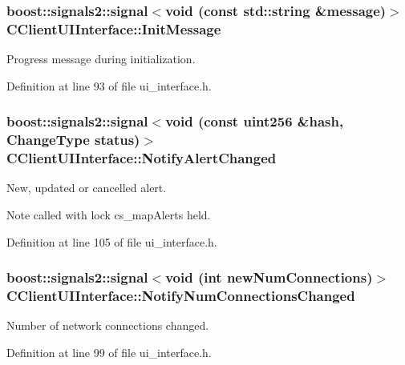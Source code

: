 \subsubsection[{Init\+Message}]{\setlength{\rightskip}{0pt plus 5cm}boost\+::signals2\+::signal$<$void (const std\+::string \&message)$>$ C\+Client\+U\+I\+Interface\+::\+Init\+Message}\label{class_c_client_u_i_interface_abc63cc3f3e5e15632f713d859dbc6bc2}
Progress message during initialization. 

Definition at line 93 of file ui\+\_\+interface.\+h.

\hypertarget{class_c_client_u_i_interface_a2c42ebdda06512513445cd86881b157a}{}
\subsubsection[{Notify\+Alert\+Changed}]{\setlength{\rightskip}{0pt plus 5cm}boost\+::signals2\+::signal$<$void (const {\bf uint256} \&{\bf hash}, {\bf Change\+Type} status)$>$ C\+Client\+U\+I\+Interface\+::\+Notify\+Alert\+Changed}\label{class_c_client_u_i_interface_a2c42ebdda06512513445cd86881b157a}
New, updated or cancelled alert. \begin{DoxyNote}{Note}
called with lock cs\+\_\+map\+Alerts held. 
\end{DoxyNote}


Definition at line 105 of file ui\+\_\+interface.\+h.

\hypertarget{class_c_client_u_i_interface_a496995d44db8dc3e3ef84d345e25967d}{}
\subsubsection[{Notify\+Num\+Connections\+Changed}]{\setlength{\rightskip}{0pt plus 5cm}boost\+::signals2\+::signal$<$void (int new\+Num\+Connections)$>$ C\+Client\+U\+I\+Interface\+::\+Notify\+Num\+Connections\+Changed}\label{class_c_client_u_i_interface_a496995d44db8dc3e3ef84d345e25967d}
Number of network connections changed. 

Definition at line 99 of file ui\+\_\+interface.\+h.

